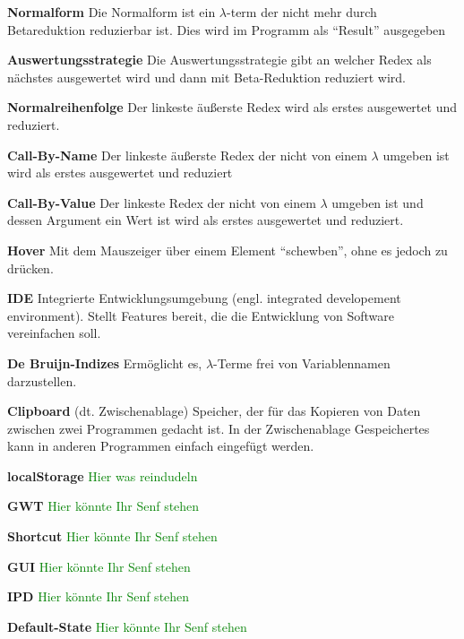 \documentclass[parskip=full,11pt,twoside]{scrartcl}
\begin{document}
\textbf{Normalform}
\newline
Die Normalform ist ein $\lambda$-term der nicht mehr durch Betareduktion reduzierbar ist. Dies wird im Programm als \enquote{Result} ausgegeben

\textbf{Auswertungsstrategie}
\newline
Die Auswertungsstrategie gibt an welcher Redex als nächstes ausgewertet wird und dann mit Beta-Reduktion reduziert wird.

\textbf{Normalreihenfolge}
\newline
Der linkeste äußerste Redex wird als erstes ausgewertet und reduziert.

\textbf{Call-By-Name}
\newline
Der linkeste äußerste Redex der nicht von einem $\lambda$ umgeben ist wird als erstes ausgewertet und reduziert

\textbf{Call-By-Value}
\newline
Der linkeste Redex der nicht von einem $\lambda$ umgeben ist und dessen Argument ein Wert ist wird als erstes ausgewertet und reduziert.

\textbf{Hover}
\newline
Mit dem Mauszeiger über einem Element \enquote{schewben}, ohne es jedoch zu drücken.

\textbf{IDE}
\newline
Integrierte Entwicklungsumgebung (engl. integrated developement environment). Stellt Features bereit, die die Entwicklung von Software vereinfachen soll.

\textbf{De Bruijn-Indizes}
\newline
Ermöglicht es, $\lambda$-Terme frei von Variablennamen darzustellen.

\textbf{Clipboard}
\newline
(dt. Zwischenablage) Speicher, der für das Kopieren von Daten zwischen zwei Programmen gedacht ist. In der Zwischenablage Gespeichertes kann in anderen Programmen einfach eingefügt werden.

\textbf{localStorage}
\newline
\textcolor{green}{Hier was reindudeln}

\textbf{GWT}
\newline
\textcolor{green}{Hier könnte Ihr Senf stehen}

\textbf{Shortcut}
\newline
\textcolor{green}{Hier könnte Ihr Senf stehen}

\textbf{GUI}
\newline
\textcolor{green}{Hier könnte Ihr Senf stehen}

\textbf{IPD}
\newline
\textcolor{green}{Hier könnte Ihr Senf stehen}

\textbf{Default-State}
\newline
\textcolor{green}{Hier könnte Ihr Senf stehen}
\end{document}
